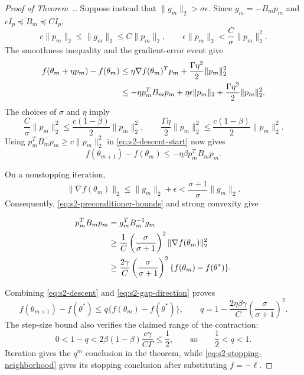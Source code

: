\begin{proof}[Proof of Theorem~{\thmMopConvergence}.]
Suppose instead that $\|g_m\|_2>\sigma\epsilon$.  Since
$g_m=-B_mp_m$ and $cI_p\preceq B_m\preceq CI_p$,
\begin{equation}
c\|p_m\|_2\leq\|g_m\|_2\leq C\|p_m\|_2,
\qquad
\epsilon\|p_m\|_2<\frac{C}{\sigma}\|p_m\|_2^2.              \label{eq:s2-noise-direction-bound}
\end{equation}
The smoothness inequality and the gradient-error event give
\begin{align}
f(\theta_m+\eta p_m)-f(\theta_m)
&\leq\eta\nabla f(\theta_m)^Tp_m
      +\frac{\Gamma\eta^2}{2}\|p_m\|_2^2\notag\\
&\leq-\eta p_m^TB_mp_m
      +\eta\epsilon\|p_m\|_2
      +\frac{\Gamma\eta^2}{2}\|p_m\|_2^2.                    \label{eq:s2-descent-start}
\end{align}
The choices of $\sigma$ and $\eta$ imply
\begin{equation*}
\frac{C}{\sigma}\|p_m\|_2^2
 \leq\frac{c(1-\beta)}2\|p_m\|_2^2,
\qquad
\frac{\Gamma\eta}{2}\|p_m\|_2^2
 \leq\frac{c(1-\beta)}2\|p_m\|_2^2.
\end{equation*}
Using $p_m^TB_mp_m\geq c\|p_m\|_2^2$ in
\eqref{eq:s2-descent-start} now gives
\begin{equation}
f(\theta_{m+1})-f(\theta_m)
\leq-\eta\beta p_m^TB_mp_m.                                  \label{eq:s2-descent}
\end{equation}

On a nonstopping iteration,
\begin{equation}
\|\nabla f(\theta_m)\|_2
 \leq\|g_m\|_2+\epsilon
 <\frac{\sigma+1}{\sigma}\|g_m\|_2.                          \label{eq:s2-gradient-comparison}
\end{equation}
Consequently, \eqref{eq:s2-preconditioner-bounds} and strong convexity give
\begin{samepage}
\begin{align}
p_m^TB_mp_m
 &=g_m^TB_m^{-1}g_m\notag\\
 &\geq\frac1C\left(\frac{\sigma}{\sigma+1}\right)^2
       \|\nabla f(\theta_m)\|_2^2\notag\\
 &\geq\frac{2\gamma}{C}
       \left(\frac{\sigma}{\sigma+1}\right)^2
       \{f(\theta_m)-f(\theta^*)\}.                           \label{eq:s2-gap-direction}
\end{align}
\end{samepage}
Combining \eqref{eq:s2-descent} and \eqref{eq:s2-gap-direction} proves
\begin{equation}
f(\theta_{m+1})-f(\theta^*)
\leq q\{f(\theta_m)-f(\theta^*)\},
\qquad
q=1-\frac{2\eta\beta\gamma}{C}
       \left(\frac{\sigma}{\sigma+1}\right)^2.               \label{eq:s2-linear-rate}
\end{equation}
The step-size bound also verifies the claimed range of the contraction:
\begin{equation*}
0<1-q
<2\beta(1-\beta)\frac{c\gamma}{C\Gamma}
\leq\frac12,
\qquad\text{so}\qquad \frac12<q<1.
\end{equation*}
Iteration gives the $q^m$ conclusion in the theorem, while
\eqref{eq:s2-stopping-neighborhood} gives its stopping conclusion after
substituting $f=-\ell$.
\end{proof}

